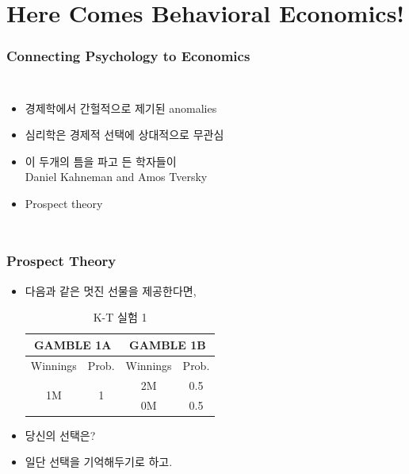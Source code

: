 \documentclass[final]{beamer}
\begin{document}
\section{Here Comes Behavioral Economics!}
%
\begin{frame}\frametitle{Connecting Psychology to Economics}\vspace{3em}
\begin{columns}[c]
%
\column{18em}
\begin{itemize}
	\item 경제학에서 간헐적으로 제기된 anomalies 
	\item 심리학은 경제적 선택에 상대적으로 무관심 
	\item 이 두개의 틈을 파고 든 학자들이\\
	Daniel Kahneman and Amos Tversky
	\item Prospect theory
\end{itemize}
%
\column{12em}
\end{columns}
\end{frame}
%
\begin{frame}\frametitle{Prospect Theory}\vspace{1.5em}
%
\begin{itemize}
\item 다음과 같은 멋진 선물을 제공한다면,
\begin{table} 
\setlength{\tabcolsep}{1.2em}
\begin{tabular}{|c|c||c|c|} \hline
\multicolumn{2}{|c||}{GAMBLE 1A}&\multicolumn{2}{c|}{GAMBLE 1B} \\ \hline
Winnings & Prob. & Winnings & Prob. \\ \hline
\multirow{2}[2]{*}{1M} & \multirow{2}[2]{*}{1} & 2M & 0.5 \\ \cline{3-4}
& & 0M & 0.5 \\  \hline
\end{tabular}
\caption{K-T 실험 1}\label{tab:03}
\end{table}
%
\item 당신의 선택은? 
\item 일단 선택을 기억해두기로 하고. 
\end{itemize}
%
\end{frame}
\end{document}
